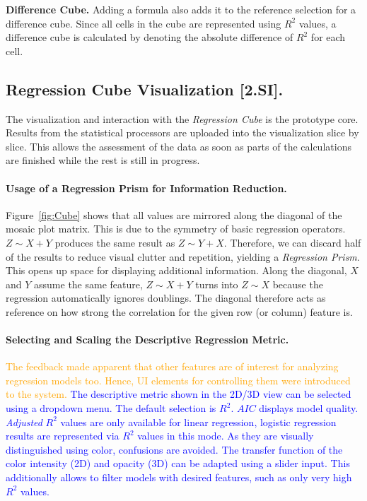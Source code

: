 \documentclass[journal]{style/vgtc} 			          %
\newcommand{\add}[1]{\textcolor{blue}{#1}}
\newcommand{\design}[1]{\textcolor{orange}{#1}}
\begin{document}
\textbf{Difference Cube.}
Adding a formula also adds it to the reference selection for a difference cube.
Since all cells in the cube are represented using $R^2$ values, a difference cube is calculated by denoting the absolute difference of $R^2$ for each cell.
\subsection{Regression Cube Visualization [2.SI].}
The visualization and interaction with the \emph{Regression Cube} is the prototype core.
Results from the statistical processors are uploaded into the visualization slice by slice.
This allows the assessment of the data as soon as parts of the calculations are finished while the rest is still in progress.

\paragraph{Usage of a Regression Prism for Information Reduction.}
Figure~\ref{fig:Cube} shows that all values are mirrored along the diagonal of the mosaic plot matrix.
This is due to the symmetry of basic regression operators.
$Z \sim X + Y$ produces the same result as $Z \sim Y + X$.
Therefore, we can discard half of the results to reduce visual clutter and repetition, yielding a \emph{Regression Prism}.
This opens up space for displaying additional information.
Along the diagonal, $X$ and $Y$ assume the same feature, $Z \sim X + Y$ turns into $Z \sim X$ because the regression automatically ignores doublings.
The diagonal therefore acts as reference on how strong the correlation for the given row (or column) feature is.

\paragraph{Selecting and Scaling the Descriptive Regression Metric.}
\design{
The feedback made apparent that other features are of interest for analyzing regression models too.
Hence, UI elements for controlling them were introduced to the system.
}
\add{
The descriptive metric shown in the 2D/3D view can be selected using a dropdown menu.
The default selection is $R^2$.
$AIC$ displays model quality.
\emph{Adjusted} $R^2$ values are only available for linear regression, logistic regression results are represented via $R^2$ values in this mode.
As they are visually distinguished using color, confusions are avoided.
The transfer function of the color intensity (2D) and opacity (3D) can be adapted using a slider input.
This additionally allows to filter models with desired features, such as only very high $R^2$ values.
}
\end{document}
